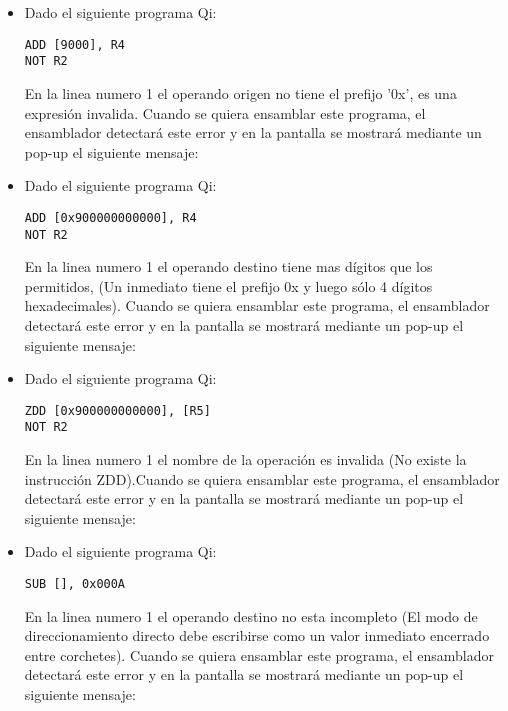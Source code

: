 \begin{itemize}

\item Dado el siguiente programa Qi:

\begin{verbatim}
ADD [9000], R4
NOT R2
\end{verbatim}

En la linea numero 1 el operando origen no tiene el prefijo '0x', es una expresión invalida. Cuando se quiera ensamblar este programa, el ensamblador detectará este error y en la pantalla se mostrará mediante un pop-up el siguiente mensaje:


\item Dado el siguiente programa Qi:

\begin{verbatim}
ADD [0x900000000000], R4
NOT R2
\end{verbatim}

En la linea numero 1 el operando destino tiene mas dígitos que los permitidos, (Un inmediato tiene el prefijo 0x y luego sólo 4 dígitos hexadecimales). Cuando se quiera ensamblar este programa, el ensamblador detectará este error y en la pantalla se mostrará mediante un pop-up el siguiente mensaje:


\item Dado el siguiente programa Qi:

\begin{verbatim}
ZDD [0x900000000000], [R5]
NOT R2
\end{verbatim}

En la linea numero 1 el nombre de la operación es invalida (No existe la instrucción ZDD).Cuando se quiera ensamblar este programa, el ensamblador detectará este error y en la pantalla se mostrará mediante un pop-up el siguiente mensaje:


\item Dado el siguiente programa Qi:

\begin{verbatim}
SUB [], 0x000A
\end{verbatim}

En la linea numero 1 el operando destino no esta incompleto (El modo de direccionamiento directo debe escribirse como un valor inmediato encerrado entre corchetes). Cuando se quiera ensamblar este programa, el ensamblador detectará este error y en la pantalla se mostrará mediante un pop-up el siguiente mensaje:


\end{itemize}
